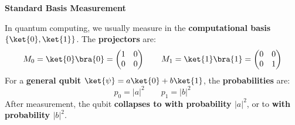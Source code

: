 \begin{flushleft}
  \textcolor{Green3}{ \textbf{Standard Basis Measurement}}
\end{flushleft}
In quantum computing, we usually measure in the \textbf{computational basis}\break $\left\{\ket{0}, \ket{1}\right\}$. The \textbf{projectors} are:
\begin{equation}
  M_{0} = \ket{0}\bra{0} = \begin{pmatrix}
      1 & 0 \\
      0 & 0
  \end{pmatrix} \qquad
  M_{1} = \ket{1}\bra{1} = \begin{pmatrix}
      0 & 0 \\
      0 & 1
  \end{pmatrix}
\end{equation}
For a \textbf{general qubit} $\ket{\psi} = a\ket{0} + b\ket{1}$, the \textbf{probabilities} are:
\begin{equation}
  p_{0} = \left|a\right|^{2} \hspace{2em} p_{1} = \left|b\right|^{2}
\end{equation}
After measurement, the qubit \textbf{collapses to  with probability $\left|a\right|^{2}$}, or to \textbf{ with probability $\left|b\right|^{2}$}.

